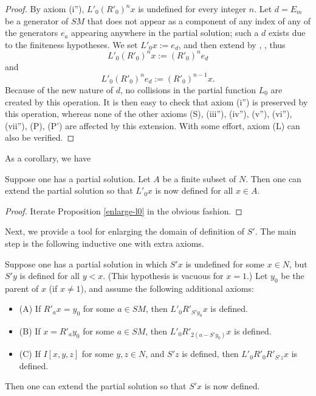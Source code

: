 \begin{proof} \leanok By axiom (i''), $L'_0 (R'_0)^n x$ is undefined for every integer $n$.  Let $d = E_m$ be a generator of $SM$ that does not appear as a component of any index of any of the generators $e_a$ appearing anywhere in the partial solution; such a $d$ exists due to the finiteness hypotheses.  We set $L'_0 x := e_d$, and then extend by , , thus
$$L'_0 (R'_0)^n x := (R'_0)^n e_d$$
and
$$L'_0 (R'_0)^n e_d := (R'_0)^{n-1} x.$$
Because of the new nature of $d$, no collisions in the partial function $L_0$ are created by this operation.  It is then easy to check that axiom (i'') is preserved by this operation, whereas none of the other axioms (S), (iii''), (iv''), (v''), (vi''), (vii''), (P), (P') are affected by this extension.  With some effort, axiom (L) can also be verified.
\end{proof}

As a corollary, we have

\begin{proposition}\label{enlarge-l0-many}\leanok  Suppose one has a partial solution.  Let $A$ be a finite subset of $N$.  Then one can extend the partial solution so that $L'_0 x$ is now defined for all $x \in A$.
\end{proposition}

\begin{proof} Iterate Proposition \ref{enlarge-l0} in the obvious fashion.
\end{proof}

Next, we provide a tool for enlarging the domain of definition of $S'$.  The main step is the following inductive one with extra axioms.

\begin{proposition}\label{enlarge-S-induct-axioms}\leanok  Suppose one has a partial solution in which $S'x$ is undefined for some $x \in N$, but $S'y$ is defined for all $y < x$.  (This hypothesis is vacuous for $x=1$.) Let $y_0$ be the parent of $x$ (if $x \neq 1$), and assume the following additional axioms:
  \begin{itemize}
    \item (A) If $R'_a x = y_0$ for some $a \in SM$, then $L'_0 R'_{S' y_0} x$ is defined.
    \item (B) If $x = R'_a y_0$ for some $a \in SM$, then $L'_0 R'_{2(a-S'y_0)} x$ is defined.
    \item (C)  If $I[x,y,z]$ for some $y,z \in N$, and $S'z$ is defined, then $L'_0 R'_0 R'_{S'z} x$ is defined.
    \end{itemize}
  Then one can extend the partial solution so that $S'x$ is now defined.
\end{proposition}

